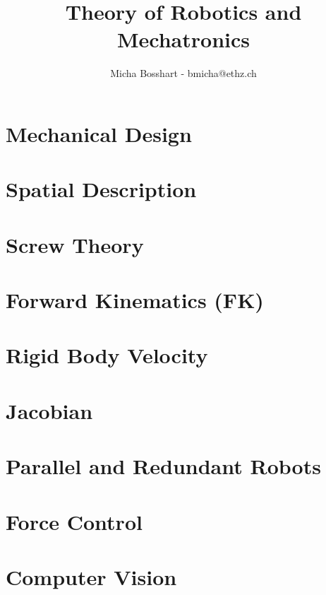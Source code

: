 \documentclass[8pt]{mpscheatsheet}
\author{Micha Bosshart - bmicha@ethz.ch}
\title{Theory of Robotics and Mechatronics}
\begin{document}
    \section{Mechanical Design}
        
    \section{Spatial Description}   
        
    \section{Screw Theory}
        
    \section{Forward Kinematics (FK)}
        
    \vfill \null \columnbreak
    \section{Rigid Body Velocity}
        
    \section{Jacobian}
        
        
        
        
        
    \section{Parallel and Redundant Robots}
        
    \section{Force Control}
        
    \section{Computer Vision}
        
\end{document}
